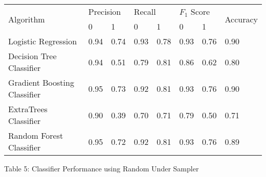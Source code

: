 \documentclass[12pt,letter-paper]{article}
\begin{document}
        \begin{table}[H]
    \begin{center}
        \begin{tabular}{|l|l|l|l|l|l|l|l|}
            \hline
            \multirow{2}{*}{Algorithm} & \multicolumn{2}{l|}{Precision} & \multicolumn{2}{l|}{Recall} & \multicolumn{2}{l|}{$F_1$ Score} & \multirow{2}{*}{Accuracy} \\ \cline{2-7}
                               & 0              & 1             & 0            & 1            & 0             & 1             &                           \\ \hline
        Logistic Regression         & 0.94           & 0.74          & 0.93         & 0.78         & 0.93          & 0.76          & 0.90                     \\ \hline
        Decision Tree Classifier         & 0.94           & 0.51          & 0.79         & 0.81         & 0.86          & 0.62          & 0.80                      \\ \hline
        Gradient Boosting Classifier & 0.95           & 0.73          & 0.92         & 0.81         & 0.93          & 0.76          & 0.90                      \\ \hline
        ExtraTrees Classifier       & 0.90           & 0.39          & 0.70         & 0.71         & 0.79          & 0.50          & 0.71                      \\ \hline
        Random Forest Classifier     & 0.95           & 0.72          & 0.92         & 0.81         & 0.93          & 0.76          & 0.89                      \\ \hline
        \end{tabular}
    \end{center}
    \begin{center}
    Table 5: Classifier Performance using Random Under Sampler
        \end{center}
    \end{table}
    
\end{document}
